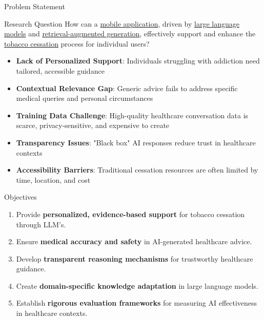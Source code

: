 \begin{frame}{Problem Statement}
  \begin{block}{Research Question}
    \centering
    How can a \underline{mobile application}, driven by \underline{large language models} and \underline{retrieval-augmented generation}, effectively support and enhance the \underline{tobacco cessation} process for individual users?
  \end{block}

  \begin{itemize}
    \item \textbf{Lack of Personalized Support}: Individuals struggling with addiction need tailored, accessible guidance
    \item \textbf{Contextual Relevance Gap}: Generic advice fails to address specific medical queries and personal circumstances
    \item \textbf{Training Data Challenge}: High-quality healthcare conversation data is scarce, privacy-sensitive, and expensive to create
    \item \textbf{Transparency Issues}: "Black box" AI responses reduce trust in healthcare contexts
    \item \textbf{Accessibility Barriers}: Traditional cessation resources are often limited by time, location, and cost
  \end{itemize}
\end{frame}

\begin{frame}{Objectives}
  \begin{enumerate}
    \item Provide \textbf{personalized, evidence-based support} for tobacco cessation through LLM's.
    \item Ensure \textbf{medical accuracy and safety} in AI-generated healthcare advice.
    \item Develop \textbf{transparent reasoning mechanisms} for trustworthy healthcare guidance.
    \item Create \textbf{domain-specific knowledge adaptation} in large language models.
    \item Establish \textbf{rigorous evaluation frameworks} for measuring AI effectiveness in healthcare contexts.
  \end{enumerate}
\end{frame}